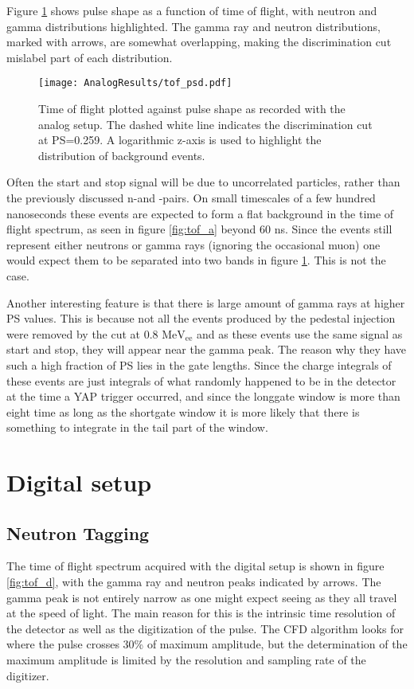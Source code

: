 \documentclass[main.tex]{subfiles}
\begin{document}
Figure \ref{fig:tof_ps_a} shows pulse shape as a function of time of flight, with neutron and gamma distributions highlighted. The gamma ray and neutron distributions, marked with arrows, are somewhat overlapping, making the discrimination cut mislabel part of each distribution.

\begin{figure}[ht]
    \centering
        \texttt{[image: AnalogResults/tof\_psd.pdf]}
        \caption[Heat map of pulse shape as a function of time of flight.]{Time of flight plotted against pulse shape as recorded with the analog setup. The dashed white line indicates the discrimination cut at PS=0.259. A logarithmic z-axis is used to highlight the distribution of background events.}
    \label{fig:tof_ps_a} 
\end{figure}


Often the start and stop signal will be due to uncorrelated particles, rather than the previously discussed n-\textgamma and \textgamma-\textgamma pairs. On small timescales of a few hundred nanoseconds these events are expected to form a flat background in the time of flight spectrum, as seen in figure \ref{fig:tof_a} beyond 60 ns. Since the events still represent either neutrons or gamma rays (ignoring the occasional muon) one would expect them to be separated into two bands in figure \ref{fig:tof_ps_a}. This is not the case.

Another interesting feature is that there is large amount of gamma rays at higher PS values. This is because not all the events produced by the pedestal injection were removed by the cut at 0.8 $\text{MeV}_\text{ee}$ and as these events use the same signal as start and stop, they will appear near the gamma peak. The reason why they have such a high fraction of PS lies in the gate lengths. Since the charge integrals of these events are just integrals of what randomly happened to be in the detector at the time a YAP trigger occurred, and since the longgate window is more than eight time as long as the shortgate window it is more likely that there is something to integrate in the tail part of the window.



\section{Digital setup}

\subsection{Neutron Tagging}
The time of flight spectrum acquired with the digital setup is shown in figure \ref{fig:tof_d}, with the gamma ray and neutron peaks indicated by arrows. The gamma peak is not entirely narrow as one might expect seeing as they all travel at the speed of light. The main reason for this is the intrinsic time resolution of the detector as well as the digitization of the pulse. The CFD algorithm looks for where the pulse crosses 30\% of maximum amplitude, but the determination of the maximum amplitude is limited by the resolution and sampling rate of the digitizer.
\end{document}

